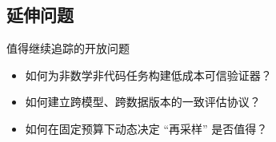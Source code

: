 \subsection{延伸问题}
\begin{warningbox}{值得继续追踪的开放问题}
\begin{itemize}
    \item 如何为非数学非代码任务构建低成本可信验证器？
    \item 如何建立跨模型、跨数据版本的一致评估协议？
    \item 如何在固定预算下动态决定 ``再采样'' 是否值得？
\end{itemize}
\end{warningbox}



